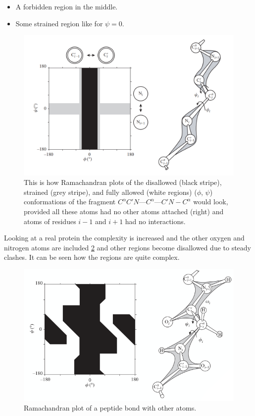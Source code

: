 	\begin{multicols}{2}
		\begin{itemize}
			\item A forbidden region in the middle.
			\item Some strained region like for $\psi=0$.
		\end{itemize}
	\end{multicols}

	\begin{figure}[H]
		\centering
		\includegraphics[scale = 0.3]{rama_map.png}
		\caption{This is how Ramachandran plots of the disallowed (black stripe), strained (grey stripe), and fully allowed (white regions) ($\phi$, $\psi$) conformations of the fragment $C^{\alpha}C'N$---$C^{\alpha}$---$C'N-C^{\alpha}$ would look, provided all these atoms had no other atoms attached (right) and atoms of residues $i-1$ and $i+1$ had no interactions.}
		\label{fig:rama}
	\end{figure}

	Looking at a real protein the complexity is increased and the other oxygen and nitrogen atoms are included \ref{fig:ramachandran-complex} and other regions become disallowed due to steady clashes.
	It can be seen how the regions are quite complex.

	\begin{figure}[H]
		\centering
		\includegraphics[scale = 0.3]{ramachandran-complex.png}
		\caption{Ramachandran plot of a peptide bond with other atoms.}
		\label{fig:ramachandran-complex}
	\end{figure}

